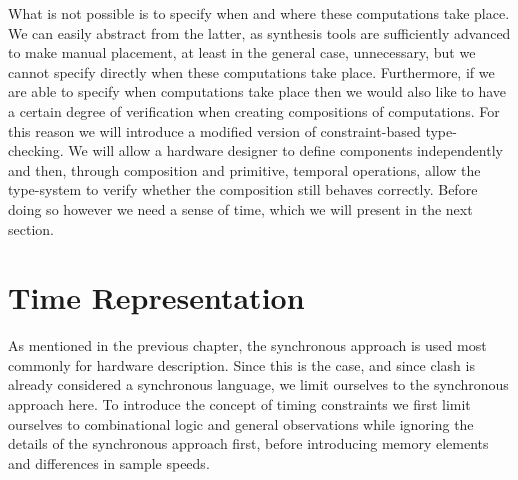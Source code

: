 What is not possible is to specify when and where these computations take place.
We can easily abstract from the latter, as synthesis tools are sufficiently advanced to make manual placement, at least in the general case, unnecessary, but we cannot specify directly when these computations take place.
Furthermore, if we are able to specify when computations take place then we would also like to have a certain degree of verification when creating compositions of computations. 
For this reason we will introduce a modified version of constraint-based type-checking.
We will allow a hardware designer to define components independently and then, through composition and primitive, temporal operations, allow the type-system to verify whether the composition still behaves correctly.
Before doing so however we need a sense of time, which we will present in the next section.


\section{Time Representation}
As mentioned in the previous chapter, the synchronous approach is used most commonly for hardware description.
Since this is the case, and since \gls{clash} is already considered a synchronous language, we limit ourselves to the synchronous approach here.
To introduce the concept of timing constraints we first limit ourselves to combinational logic and general observations while ignoring the details of the synchronous approach first, before introducing memory elements and differences in sample speeds.

